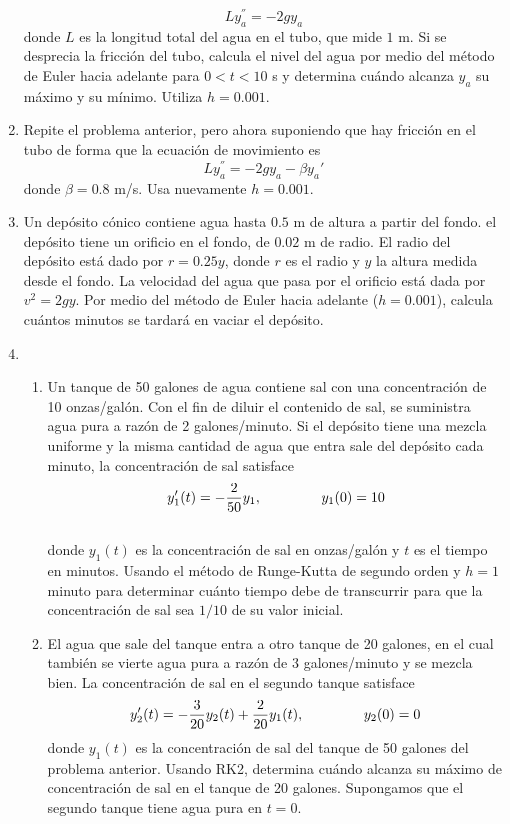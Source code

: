 \documentclass[letterpaper]{article}
\begin{document}
\begin{enumerate}
\[ Ly_{a}^{''} = -2 gy_{a} \]
donde $L$ es la longitud total del agua en el tubo, que mide $1$ m. Si se desprecia la fricción del tubo, calcula el nivel del agua por medio del método de Euler hacia adelante para $0 < t < 10$ s y determina cuándo alcanza $y_{a}$ su máximo y su mínimo. Utiliza $h=0.001$.
\item Repite el problema anterior, pero ahora suponiendo que hay fricción en el tubo de forma que la ecuación de movimiento es 
\[ Ly_{a}^{''} = -2 gy_{a} - \beta y_{a}{'}\]
donde $\beta=0.8$ m/s. Usa nuevamente $h=0.001$.
\item Un depósito cónico contiene agua hasta $0.5$ m de altura a partir del fondo. el depósito tiene un orificio en el fondo, de $0.02$ m de radio. El radio del depósito está dado por $r=0.25y$, donde $r$ es el radio y $y$ la altura medida desde el fondo. La velocidad del agua que pasa por el orificio está dada por $v^{2}=2gy$. Por medio del método de Euler hacia adelante ($h=0.001$), calcula cuántos minutos se tardará en vaciar el depósito.
\item \begin{enumerate}
\item Un tanque de 50 galones de agua contiene sal con una concentración de 10 onzas/galón. Con el fin de diluir el contenido de sal, se suministra agua pura a razón de 2 galones/minuto. Si el depósito tiene una mezcla uniforme y la misma cantidad de agua que entra sale del depósito cada minuto, la concentración de sal satisface\\
\[ y'_{1}(t)= -\frac{2}{50}y_{1}, \hspace{1.5cm} y_{1}(0)=10 \]\\
donde $y_{1}(t)$ es la concentración de sal en onzas/galón y $t$ es el tiempo en minutos. Usando el método de Runge-Kutta de segundo orden y $h=1$ minuto para determinar cuánto tiempo debe de transcurrir para que la concentración de sal sea $1/10$ de su valor inicial.
\item El agua que sale del tanque entra a otro tanque de 20 galones, en el cual también se vierte agua pura a razón de 3 galones/minuto y se mezcla bien. La concentración de sal en el segundo tanque satisface
\[ y'_{2}(t)= -\frac{3}{20}y_{2}(t)+\dfrac{2}{20}y_{1}(t), \hspace{1.5cm} y_{2}(0)=0 \]
donde $y_{1}(t)$ es la concentración de sal del tanque de 50 galones del problema anterior. Usando RK2, determina cuándo alcanza su máximo de concentración de sal en el tanque de 20 galones. Supongamos que el segundo tanque tiene agua pura en $t=0$.

\end{enumerate}
\end{enumerate}
\end{document}
